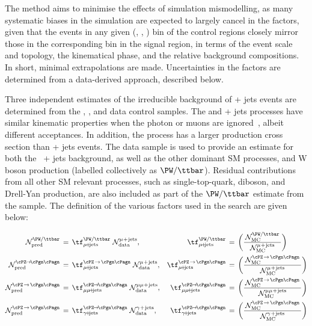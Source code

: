 The method aims to minimise the effects of simulation mismodelling, as
many systematic biases in the simulation are expected to largely
cancel in the \tf factors, given that the events in any given
(\njet, \nb, \scalht) bin of the control regions closely mirror those
in the corresponding bin in the signal region, in terms of the event
scale and topology, the kinematical phase, and the relative background
compositions. In short, minimal extrapolations are made. Uncertainties
in the \tf factors are determined from a data-derived approach,
described below.

Three independent estimates of the irreducible background of \znunu +
jets events are determined from the \gj, \mmj, and \mj data control
samples. The \gj and \zmumu + jets processes have similar kinematic
properties when the photon or muons are ignored~\cite{Bern:2011pa},
albeit different acceptances. In addition, the \gj process has a
larger production cross section than \znunu + jets events. The \mj
data sample is used to provide an estimate for both the \znunu\ + jets
background, as well as the other dominant SM processes, \ttbar and W
boson production (labelled collectively as $\PW/\ttbar$). Residual
contributions from all other SM relevant processes, such as
single-top-quark, diboson, and Drell-Yan production, are also included
as part of the $\PW/\ttbar$ estimate from the \mj sample. The
definition of the various \tf factors used in the search are given
below:

\begin{align} 
  \mathcal{N}^\text{\PW/\ttbar}_\text{pred} \, & = \,
  \tf^\text{\PW/\ttbar}_{\mj} \; 
  \mathcal{N}^\text{\mj}_\text{data}, &
  \tf^\text{\PW/\ttbar}_{\mj} \, & = \,
  \bigg( 
  \frac{\,\mathcal{N}^{\PW/\ttbar}_\text{MC}\,}
  {\mathcal{N}^\text{\mj}_\text{MC}}
  \bigg) \\
  \mathcal{N}^{\znunu}_\text{pred} \, & = \,
  \tf^{\text{\znunu}}_{\mj} \; 
  \mathcal{N}^\text{\mj}_\text{data}, &
  \tf^{\text{\znunu}}_{\mj} \, & = \,
  \bigg( 
  \frac{\,\mathcal{N}^\text{\znunu}_\text{MC}\,}
  {\mathcal{N}^\text{\mj}_\text{MC}}
  \bigg) \\
  \mathcal{N}^\text{\znunu}_\text{pred} \, & = \,
  \tf^{\znunu}_{\mmj}  \;
  \mathcal{N}^\text{\mmj}_\text{data}, &
  \tf^{\znunu}_{\mmj}  \, & = \,
  \bigg( 
  \frac{\,\mathcal{N}^\text{\znunu}_\text{MC}\,}
  {\mathcal{N}^\text{\mmj}_\text{MC}}
  \bigg) \\
  \mathcal{N}^\text{\znunu}_\text{pred} \, & = \,
  \tf^{\znunu}_{\gj}  \;
  \mathcal{N}^\text{\gj}_\text{data}, &
  \tf^{\znunu}_{\gj}  \, & = \,
  \bigg( 
  \frac{\,\mathcal{N}^\text{\znunu}_\text{MC}\,}
  {\mathcal{N}^\text{\gj}_\text{MC}}
  \bigg)
\end{align} 

